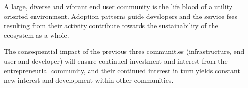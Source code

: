 A large, diverse and vibrant end user community is the life blood of a utility oriented environment. Adoption patterns guide developers and the service fees resulting from their activity contribute towards the sustainability of the ecosystem as a whole.

The consequential impact of the previous three communities (infrastructure, end user and developer) will ensure continued investment and interest from the entrepreneurial community, and their continued interest in turn yields constant new interest and development within other communities.
